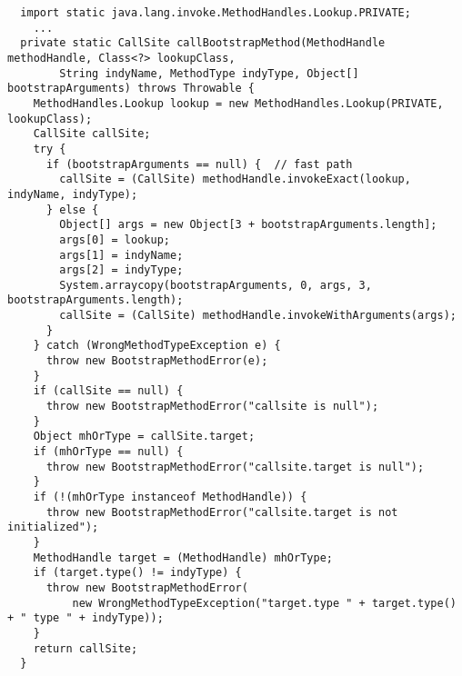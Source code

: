 {\tiny \begin{verbatim}
  import static java.lang.invoke.MethodHandles.Lookup.PRIVATE;
    ...
  private static CallSite callBootstrapMethod(MethodHandle methodHandle, Class<?> lookupClass,
        String indyName, MethodType indyType, Object[] bootstrapArguments) throws Throwable {
    MethodHandles.Lookup lookup = new MethodHandles.Lookup(PRIVATE, lookupClass);
    CallSite callSite;
    try {
      if (bootstrapArguments == null) {  // fast path
        callSite = (CallSite) methodHandle.invokeExact(lookup, indyName, indyType);
      } else {
        Object[] args = new Object[3 + bootstrapArguments.length];
        args[0] = lookup;
        args[1] = indyName;
        args[2] = indyType;
        System.arraycopy(bootstrapArguments, 0, args, 3, bootstrapArguments.length);
        callSite = (CallSite) methodHandle.invokeWithArguments(args);
      }
    } catch (WrongMethodTypeException e) {
      throw new BootstrapMethodError(e);
    }
    if (callSite == null) {
      throw new BootstrapMethodError("callsite is null");
    }
    Object mhOrType = callSite.target;
    if (mhOrType == null) {
      throw new BootstrapMethodError("callsite.target is null");
    }
    if (!(mhOrType instanceof MethodHandle)) {
      throw new BootstrapMethodError("callsite.target is not initialized");
    }
    MethodHandle target = (MethodHandle) mhOrType;
    if (target.type() != indyType) {
      throw new BootstrapMethodError(
          new WrongMethodTypeException("target.type " + target.type() + " type " + indyType));
    }
    return callSite;
  }
\end{verbatim} }
